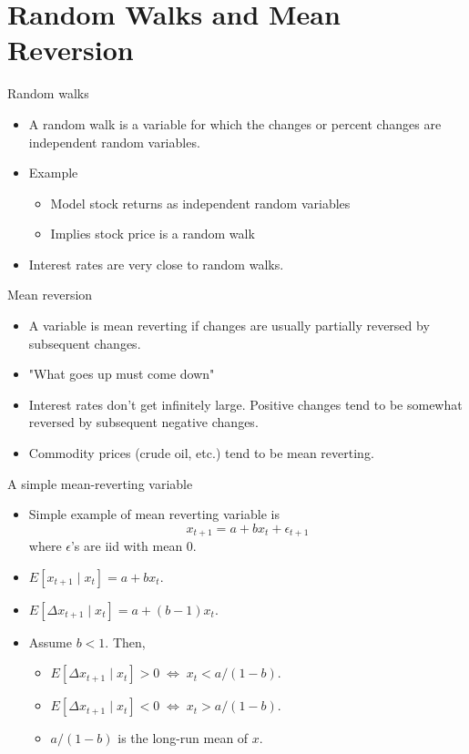 \documentclass[10pt]{beamer}
\begin{document}
\section{Random Walks and Mean Reversion}
\begin{frame}{Random walks}
\begin{itemize}
\item A random walk is a variable for which the \alert{changes} or \alert{percent changes} are independent random variables.
\item Example
\begin{itemize}
\item Model stock returns as independent random variables
\item Implies stock price is a random walk
\end{itemize}
\item Interest rates are very close to random walks.
\end{itemize}
\end{frame}

\begin{frame}{Mean reversion}
\begin{itemize}
\item A variable is mean reverting if changes are usually partially reversed by subsequent changes.
\item "What goes up must come down" 
\item Interest rates don't get infinitely large.  Positive changes tend to be somewhat reversed by subsequent negative changes.
\item Commodity prices (crude oil, etc.) tend to be mean reverting.
\end{itemize}
\end{frame}

\begin{frame}{A simple mean-reverting variable}
\begin{itemize}
\item Simple example of mean reverting variable is
$$x_{t+1} = a + b x_t + \epsilon_{t+1}$$
where $\epsilon$'s are iid with mean 0.
\item $E[x_{t+1} \mid x_t] = a + b x_t$.
\item $E[\Delta x_{t+1} \mid x_t] = a + (b-1) x_t$.
\item Assume $b<1$.  Then,
\begin{itemize}
\item $E[\Delta x_{t+1} \mid x_t] > 0 \;\Leftrightarrow\; x_t < a/(1-b)$.
\item $E[\Delta x_{t+1} \mid x_t] < 0 \;\Leftrightarrow\; x_t > a/(1-b)$.
\item $a/(1-b)$ is the long-run mean of $x$.
\end{itemize}
\end{itemize}
\end{frame}
\end{document}
